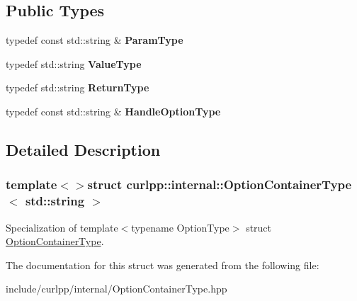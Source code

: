 \subsection*{Public Types}
\begin{DoxyCompactItemize}
\item 
\hypertarget{structcurlpp_1_1internal_1_1OptionContainerType_3_01std_1_1string_01_4_aaedba1efcca7376381558b345dce2943}{typedef const std\-::string \& {\bfseries Param\-Type}}\label{structcurlpp_1_1internal_1_1OptionContainerType_3_01std_1_1string_01_4_aaedba1efcca7376381558b345dce2943}

\item 
\hypertarget{structcurlpp_1_1internal_1_1OptionContainerType_3_01std_1_1string_01_4_a68965b33bbc726a9fd2c7700c66ba63a}{typedef std\-::string {\bfseries Value\-Type}}\label{structcurlpp_1_1internal_1_1OptionContainerType_3_01std_1_1string_01_4_a68965b33bbc726a9fd2c7700c66ba63a}

\item 
\hypertarget{structcurlpp_1_1internal_1_1OptionContainerType_3_01std_1_1string_01_4_ab21fe73a76ccd7f4541143c2e2bc41a3}{typedef std\-::string {\bfseries Return\-Type}}\label{structcurlpp_1_1internal_1_1OptionContainerType_3_01std_1_1string_01_4_ab21fe73a76ccd7f4541143c2e2bc41a3}

\item 
\hypertarget{structcurlpp_1_1internal_1_1OptionContainerType_3_01std_1_1string_01_4_a23e46b12f715b6b0674cbac93d344d37}{typedef const std\-::string \& {\bfseries Handle\-Option\-Type}}\label{structcurlpp_1_1internal_1_1OptionContainerType_3_01std_1_1string_01_4_a23e46b12f715b6b0674cbac93d344d37}

\end{DoxyCompactItemize}


\subsection{Detailed Description}
\subsubsection*{template$<$$>$struct curlpp\-::internal\-::\-Option\-Container\-Type$<$ std\-::string $>$}

Specialization of template$<$typename Option\-Type$>$ struct \hyperlink{structcurlpp_1_1internal_1_1OptionContainerType}{Option\-Container\-Type}. 

The documentation for this struct was generated from the following file\-:\begin{DoxyCompactItemize}
\item 
include/curlpp/internal/Option\-Container\-Type.\-hpp\end{DoxyCompactItemize}
